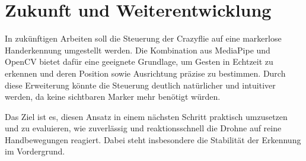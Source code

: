\section{Zukunft und Weiterentwicklung}

In zukünftigen Arbeiten soll die Steuerung der Crazyflie auf eine markerlose Handerkennung umgestellt werden.
Die Kombination aus MediaPipe und OpenCV bietet dafür eine geeignete Grundlage, um Gesten in Echtzeit zu erkennen und deren Position sowie Ausrichtung präzise zu bestimmen.
Durch diese Erweiterung könnte die Steuerung deutlich natürlicher und intuitiver werden, da keine sichtbaren Marker mehr benötigt würden.

Das Ziel ist es, diesen Ansatz in einem nächsten Schritt praktisch umzusetzen und zu evaluieren, wie zuverlässig und reaktionsschnell die Drohne auf reine Handbewegungen reagiert.
Dabei steht insbesondere die Stabilität der Erkennung im Vordergrund.

\endgroup
